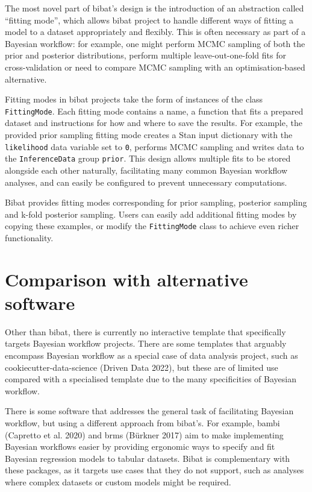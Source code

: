 \documentclass[
  letterpaper,
  DIV=11,
  numbers=noendperiod]{scrartcl}
\begin{document}
The most novel part of bibat's design is the introduction of an
abstraction called ``fitting mode'', which allows bibat project to
handle different ways of fitting a model to a dataset appropriately and
flexibly. This is often necessary as part of a Bayesian workflow: for
example, one might perform MCMC sampling of both the prior and posterior
distributions, perform multiple leave-out-one-fold fits for
cross-validation or need to compare MCMC sampling with an
optimisation-based alternative.

Fitting modes in bibat projects take the form of instances of the class
\texttt{FittingMode}. Each fitting mode contains a name, a function that
fits a prepared dataset and instructions for how and where to save the
results. For example, the provided prior sampling fitting mode creates a
Stan input dictionary with the \texttt{likelihood} data variable set to
\texttt{0}, performs MCMC sampling and writes data to the
\texttt{InferenceData} group \texttt{prior}. This design allows multiple
fits to be stored alongside each other naturally, facilitating many
common Bayesian workflow analyses, and can easily be configured to
prevent unnecessary computations.

Bibat provides fitting modes corresponding for prior sampling, posterior
sampling and k-fold posterior sampling. Users can easily add additional
fitting modes by copying these examples, or modify the
\texttt{FittingMode} class to achieve even richer functionality.

\section{Comparison with alternative
software}\label{comparison-with-alternative-software}

Other than bibat, there is currently no interactive template that
specifically targets Bayesian workflow projects. There are some
templates that arguably encompass Bayesian workflow as a special case of
data analysis project, such as cookiecutter-data-science (Driven Data
2022), but these are of limited use compared with a specialised template
due to the many specificities of Bayesian workflow.

There is some software that addresses the general task of facilitating
Bayesian workflow, but using a different approach from bibat's. For
example, bambi (Capretto et al. 2020) and brms (Bürkner 2017) aim to
make implementing Bayesian workflows easier by providing ergonomic ways
to specify and fit Bayesian regression models to tabular datasets. Bibat
is complementary with these packages, as it targets use cases that they
do not support, such as analyses where complex datasets or custom models
might be required.
\end{document}
